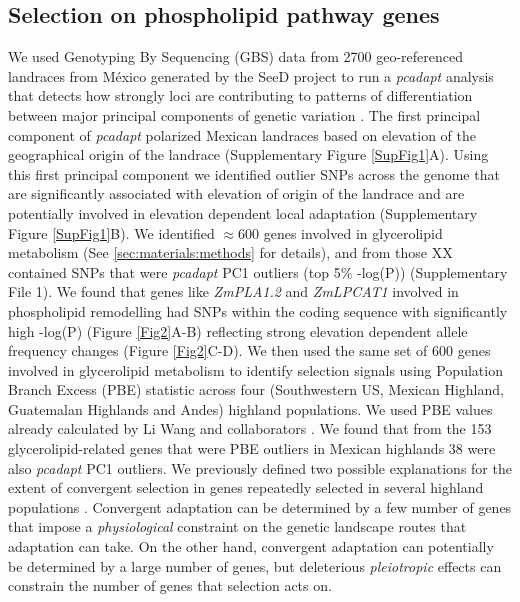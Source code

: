 \documentclass[9pt,twocolumn,twoside,lineno]{BioRxiv}
\begin{document}
\subsection{Selection on phospholipid pathway genes} 
We used Genotyping By Sequencing (GBS) data from 2700 geo-referenced landraces from México generated by the SeeD project \cite{Romero_Navarro2017-cn, Gates2019-xu} to run a \textit{pcadapt} analysis that detects how strongly loci are contributing to patterns of differentiation between major principal components of genetic variation \cite{Luu2017-ws}.
The first principal component of \textit{pcadapt} polarized Mexican landraces based on elevation of the geographical origin of the landrace (Supplementary Figure \ref{SupFig1}A).
Using this first principal component we identified outlier SNPs across the genome that are significantly associated with elevation of origin of the landrace and are potentially involved in elevation dependent local adaptation (Supplementary Figure \ref{SupFig1}B).
We identified $\approx 600$ genes involved in glycerolipid metabolism (See \ref{sec:materials:methods} for details), and from those XX contained SNPs that were \textit{pcadapt} PC1 outliers (top 5\% -log(P)) (Supplementary File 1).
We found that genes like \textit{ZmPLA1.2} and \textit{ZmLPCAT1} involved in phospholipid remodelling had SNPs within the coding sequence with significantly high -log(P) (Figure \ref{Fig2}A-B)  reflecting strong elevation dependent allele frequency changes (Figure \ref{Fig2}C-D). 
We then used the same set of 600 genes involved in glycerolipid metabolism to identify selection signals using Population Branch Excess (PBE) \cite{Pool2017-oa} statistic across four (Southwestern US, Mexican Highland, Guatemalan Highlands and Andes) highland populations. 
We used PBE values already calculated by Li Wang  and collaborators \cite{Wang2020-mp}.
We found that from the 153 glycerolipid-related genes that were PBE outliers in Mexican highlands 38 were also \textit{pcadapt} PC1 outliers.
We previously defined two possible explanations for the extent of convergent selection in genes repeatedly selected in several highland populations \cite{Wang2020-mp, yeaman2018}. 
Convergent adaptation can be determined by a few number of genes that impose a \textit{physiological} constraint on the genetic landscape routes that adaptation can take. 
On the other hand, convergent adaptation can potentially be determined by a large number of genes, but deleterious \textit{pleiotropic} effects can constrain the number of genes that selection acts on.  
\end{document}
